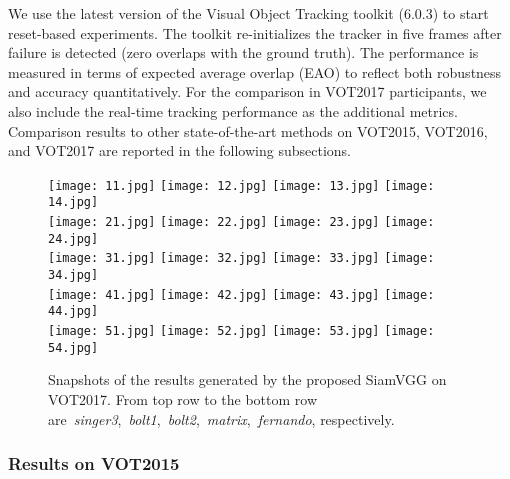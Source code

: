 \documentclass[runningheads]{llncs}
\begin{document}
We use the latest version of the Visual Object Tracking toolkit (6.0.3) to start reset-based experiments. The toolkit re-initializes the tracker in five frames after failure is detected (zero overlaps with the ground truth). The performance is measured in terms of expected average overlap (EAO) to reflect both robustness and accuracy quantitatively. For the comparison in VOT2017 participants, we also include the real-time tracking performance as the additional metrics. Comparison results to other state-of-the-art methods on VOT2015, VOT2016, and VOT2017 are reported in the following subsections.
\begin{figure}
\centering
\texttt{[image: 11.jpg]}\hfill
\texttt{[image: 12.jpg]}\hfill
\texttt{[image: 13.jpg]}\hfill
\texttt{[image: 14.jpg]}\hfill\\
\texttt{[image: 21.jpg]}\hfill
\texttt{[image: 22.jpg]}\hfill
\texttt{[image: 23.jpg]}\hfill
\texttt{[image: 24.jpg]}\hfill\\
\texttt{[image: 31.jpg]}\hfill
\texttt{[image: 32.jpg]}\hfill
\texttt{[image: 33.jpg]}\hfill
\texttt{[image: 34.jpg]}\hfill\\
\texttt{[image: 41.jpg]}\hfill
\texttt{[image: 42.jpg]}\hfill
\texttt{[image: 43.jpg]}\hfill
\texttt{[image: 44.jpg]}\hfill\\
\texttt{[image: 51.jpg]}\hfill
\texttt{[image: 52.jpg]}\hfill
\texttt{[image: 53.jpg]}\hfill
\texttt{[image: 54.jpg]}\hfill

\vspace{-8pt}
    
\caption{Snapshots of the results generated by the proposed SiamVGG on VOT2017. From top row to the bottom row are~\textit{singer3},~\textit{bolt1},~\textit{bolt2},~\textit{matrix},~\textit{fernando}, respectively.}

\label{fig:xzgt}
\end{figure}


\subsubsection{Results on VOT2015}
\end{document}
